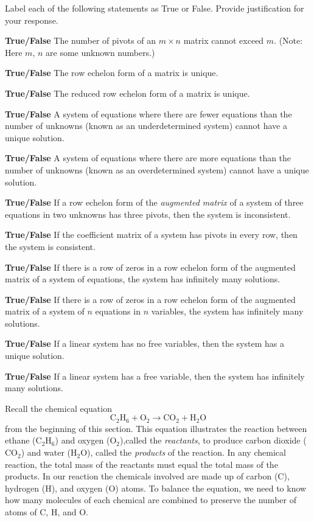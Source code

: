 \item Label each of the following statements as True or False. Provide justification for your response.
	\ba
	\item \textbf{True/False} The number of pivots of an $m \times n$ matrix cannot exceed $m$. (Note: Here $m$, $n$ are some unknown numbers.)
	\item \textbf{True/False} The row echelon form of a matrix is unique.
	\item \textbf{True/False} The reduced row echelon form of a matrix is unique.
	\item \textbf{True/False} A system of equations where there are fewer equations than the number of unknowns (known as an underdetermined system) cannot have a unique solution.
	\item \textbf{True/False} A system of equations where there are more equations than the number of unknowns (known as an overdetermined system) cannot have a unique solution.
	\item  \textbf{True/False} If a row echelon form of the {\em augmented matrix} of a system of three equations in two unknowns has three pivots, then the system is inconsistent.
	\item \textbf{True/False} If the coefficient matrix of a system has pivots in every row, then the system is consistent.
	\item \textbf{True/False} If there is a row of zeros in a row echelon form of the augmented matrix of a system of equations, the
system has infinitely many solutions.
	\item \textbf{True/False} If there is a row of zeros in a row echelon form of the augmented matrix of a system of $n$ equations in $n$ variables, the system has infinitely many solutions.
	\item \textbf{True/False} If a linear system has no free variables, then the system has a unique solution.
	\item  \textbf{True/False} If a linear system has a free variable, then the system has infinitely many solutions.
	\ea
\ee



Recall the chemical equation
\begin{equation*}
\text{C}_2\text{H}_6 + \text{O}_2 \to \text{CO}_2 + \text{H}_2\text{O} %
\end{equation*}
from the beginning of this section. This equation illustrates the reaction between ethane ($\text{C}_2\text{H}_6$) and oxygen ($\text{O}_2$),called the \emph{reactants}, to produce carbon dioxide ($\text{CO}_2$) and water ($\text{H}_2\text{O}$), called the \emph{products} of the reaction.  In any chemical reaction, the total mass of the reactants must equal the total mass of the products. In our reaction the chemicals involved are made up of carbon (C), hydrogen (H), and oxygen (O) atoms. To balance the equation, we need to know how many molecules of each chemical are combined to preserve the number of atoms of C, H, and O.

